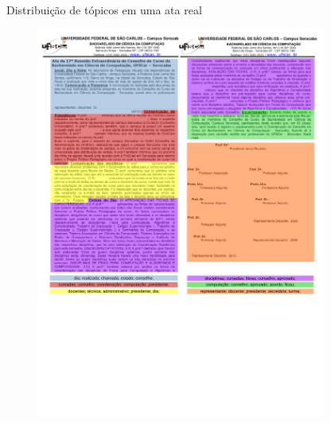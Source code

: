 \documentclass[xcolor=table]{beamer}
\begin{document}
\begin{frame}{Distribuição de tópicos em uma ata real}

	\begin{figure}[h!]

		\includegraphics[trim={ 0 265 0 16 },clip,page=1,width=0.85\textwidth]{images/distribuicao.pdf}

	\end{figure}

\end{frame}
\end{document}
